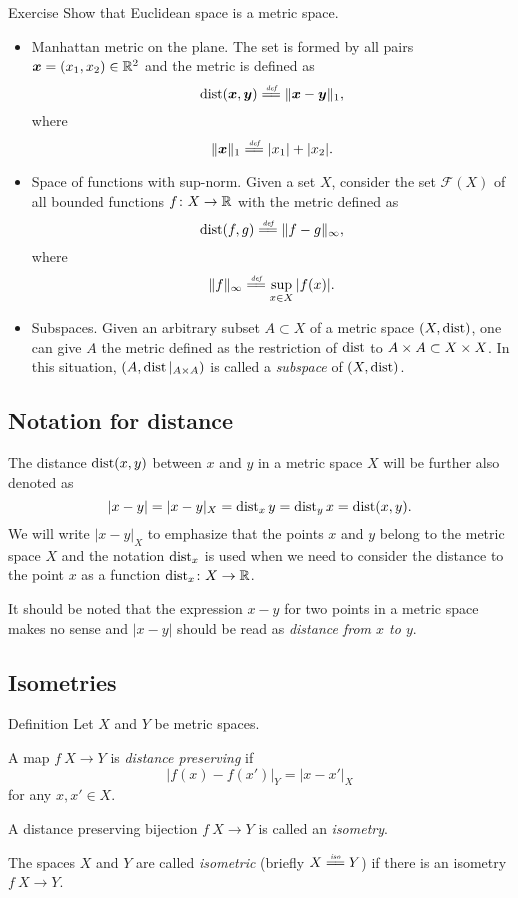 \begin{thm}{Exercise}\label{ex:Euclidean-is-metric}
Show that Euclidean space is a metric space.
\end{thm}

\begin{itemize}
\item \label{manhattan-metric} Manhattan metric on the plane. The set is formed by all pairs $\bm{x}\z=(x_1,x_2)\in\RR^2$ and the metric is defined as 
$$\Dist(\bm{x},\bm{y})
\df
\lVert\bm{x}-\bm{y}\rVert_1,$$
where 
$$\lVert\bm{x}\rVert_1
\df
|x_1|+|x_2|.
$$
\item Space of functions with sup-norm.
Given a set $X$,
consider the set $\mathcal{F}(X)$ of all bounded functions 
$f\colon X\to\mathbb{R}$ with the metric defined as
$$\Dist(f,g)
\df
\lVert f-g\rVert_\infty,$$
where
$$\lVert f\rVert_\infty
\df 
\sup_{x\in X}|f(x)|.
$$
\item Subspaces. Given an arbitrary subset $A\subset X$ of a metric space $(X,\operatorname{dist})$,
one can give $A$ the metric defined as the restriction of $\operatorname{dist}$ to $A\times A\z\subset X\times X$. 
In this situation, $(A,\operatorname{dist}|_{A\times A})$ is called a \emph{subspace} of $(X,\operatorname{dist})$.
\end{itemize}

\subsection*{Notation for distance}

The distance $\operatorname{dist}(x,y)$ between $x$ and $y$ in a metric space $X$ will be further also denoted as 
$$|x-y|=|x-y|_X=\operatorname{dist}_x y=\operatorname{dist}_y x=\operatorname{dist}(x,y).$$
We will write $|x-y|_X$ to emphasize that the points $x$ and $y$ belong to the metric space $X$
and the notation $\operatorname{dist}_x$ is used when we need to consider the distance to the point $x$ as a function $\operatorname{dist}_x\colon X\to\mathbb{R}$.

It should be noted that the expression $x-y$ for two points in a metric space makes no sense
and $|x-y|$ should be read as \emph{distance from $x$ to $y$}.

\subsection*{Isometries}

\begin{thm}{Definition}
Let $X$ and $Y$ be metric spaces.
\begin{subthm}{}
A map $f\:X\to Y$ is \emph{distance preserving} if
$$|f(x)-f(x')|_Y=|x-x'|_X$$
for any $x,x'\in X$.
\end{subthm}

\begin{subthm}{}
A distance preserving bijection $f\:X\to Y$ is called an \emph{isometry}.
\end{subthm}

\begin{subthm}{}
The spaces $X$ and $Y$ are called \emph{isometric} (briefly $X\iso Y$)
 if there is an isometry  $f\:X\to Y$.
\end{subthm}

\end{thm}

